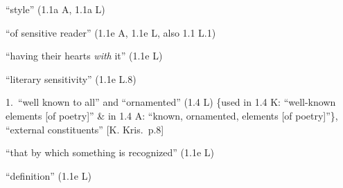 \documentclass[10pt]{article}
\begin{document}
\begin{multicols}{2}
\begin{enumerate}[
			leftmargin=0em,
			rightmargin=0em,
		]
		 ``style'' (1.1a A, 1.1a L)

		 ``of sensitive reader'' (1.1e A, 1.1e L, also 1.1 L.1)

		 ``having their hearts \textit{with} it'' (1.1e L)

		 ``literary sensitivity'' (1.1e L.8)


		 1.\ ``well known to all'' and ``ornamented'' (1.4 L) \{used in 1.4 K: ``well-known elements [of poetry]'' \& in 1.4 A: ``known, ornamented, elements [of poetry]''\},
		``external constituents'' [K. Kris.\ p.8]

		 ``that by which something is recognized'' (1.1e L)

		 ``definition'' (1.1e L)



\end{enumerate}
\end{multicols}
\end{document}
